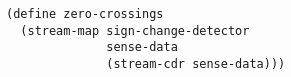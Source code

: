 \documentclass[a4paper,12pt]{article}
\begin{document}
\begin{lstlisting}
(define zero-crossings
  (stream-map sign-change-detector
              sense-data
              (stream-cdr sense-data)))
\end{lstlisting}
\end{document}
